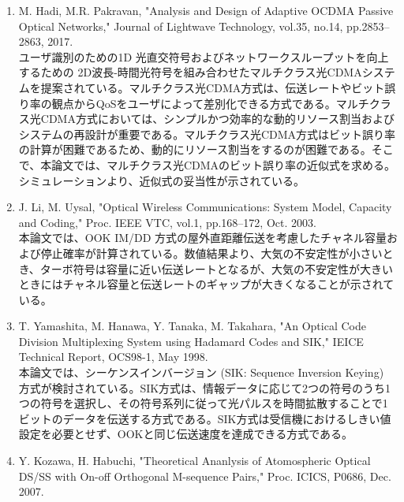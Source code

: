 ﻿\documentclass[a4j,10pt]{jarticle}
\begin{document}
\begin{enumerate}
上記2論文は、大気の不安定性のよって生じる光強度のゆらぎを考慮した光強度変調/直接検波 (IM/DD: Intensity Modulation with Direct Detection)方式の性能解析式が導出されている。Kiasalehは、パルス位置変調 (PPM: Pulse Position Modulation)を用いたIM/DD方式、Zhuらはオンオフキーイング (OOK: On-off Keying)を用いたIM/DD方式を対象とし、性能解析式を導出している。\footnote{非直交CSKを用いたIM/DD方式において大気の不安定性のよって生じる光強度のゆらぎ（シンチレーション）を考慮した性能解析を行う際に、本論文を参考にした。}
%
%
\item M. Hadi, M.R. Pakravan, 
"Analysis and Design of Adaptive OCDMA Passive Optical Networks," 
Journal of Lightwave Technology, vol.35, no.14, pp.2853--2863, 2017. \\
ユーザ識別のための1D 光直交符号およびネットワークスループットを向上するための 2D波長-時間光符号を組み合わせたマルチクラス光CDMAシステムを提案されている。マルチクラス光CDMA方式は、伝送レートやビット誤り率の観点からQoSをユーザによって差別化できる方式である。マルチクラス光CDMA方式においては、シンプルかつ効率的な動的リソース割当およびシステムの再設計が重要である。マルチクラス光CDMA方式はビット誤り率の計算が困難であるため、動的にリソース割当をするのが困難である。そこで、本論文では、マルチクラス光CDMAのビット誤り率の近似式を求める。シミュレーションより、近似式の妥当性が示されている。
%
\item J. Li, M. Uysal,  
"Optical Wireless Communications: System Model, Capacity and Coding," 
Proc. IEEE VTC, vol.1, pp.168--172, Oct. 2003. \\
本論文では、OOK IM/DD 方式の屋外直距離伝送を考慮したチャネル容量および停止確率が計算されている。数値結果より、大気の不安定性が小さいとき、ターボ符号は容量に近い伝送レートとなるが、大気の不安定性が大きいときにはチャネル容量と伝送レートのギャップが大きくなることが示されている。
%
\item T. Yamashita, M. Hanawa, Y. Tanaka, M. Takahara, 
"An Optical Code Division Multiplexing System using Hadamard Codes and SIK," 
IEICE Technical Report, OCS98-1, May 1998. \\
本論文では、シーケンスインバージョン (SIK: Sequence Inversion Keying) 方式が検討されている。SIK方式は、情報データに応じて2つの符号のうち1つの符号を選択し、その符号系列に従って光パルスを時間拡散することで1ビットのデータを伝送する方式である。SIK方式は受信機におけるしきい値設定を必要とせず、OOKと同じ伝送速度を達成できる方式である。
%
\item Y. Kozawa, H. Habuchi, 
"Theoretical Ananlysis of Atomospheric Optical DS/SS with On-off Orthogonal 
M-sequence Pairs," Proc. ICICS, P0686, Dec. 2007. \\

\end{enumerate}
\end{document}
